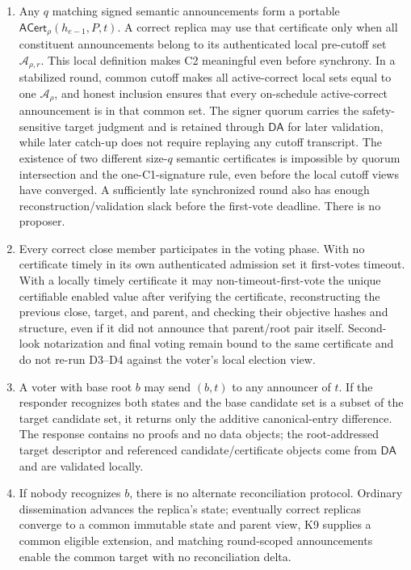 \documentclass[11pt]{article}
\theoremstyle{definition}
\theoremstyle{remark}
\newcommand{\DA}{\mathsf{DA}}
\newcommand{\ACert}{\mathsf{ACert}}
\begin{document}
\begin{enumerate}[leftmargin=2.0em]
  \item Any $q$ matching signed semantic announcements form a portable $\ACert_\rho(h_{e-1},P,t)$. A correct replica may use that certificate only when all constituent announcements belong to its authenticated local pre-cutoff set $\mathcal A_{\rho,r}$. This local definition makes C2 meaningful even before synchrony. In a stabilized round, common cutoff makes all active-correct local sets equal to one $\mathcal A_\rho$, and honest inclusion ensures that every on-schedule active-correct announcement is in that common set. The signer quorum carries the safety-sensitive target judgment and is retained through $\DA$ for later validation, while later catch-up does not require replaying any cutoff transcript. The existence of two different size-$q$ semantic certificates is impossible by quorum intersection and the one-C1-signature rule, even before the local cutoff views have converged. A sufficiently late synchronized round also has enough reconstruction/validation slack before the first-vote deadline. There is no proposer.

  \item Every correct close member participates in the voting phase. With no certificate timely in its own authenticated admission set it first-votes timeout. With a locally timely certificate it may non-timeout-first-vote the unique certifiable enabled value after verifying the certificate, reconstructing the previous close, target, and parent, and checking their objective hashes and structure, even if it did not announce that parent/root pair itself. Second-look notarization and final voting remain bound to the same certificate and do not re-run D3--D4 against the voter's local election view.

  \item A voter with base root $b$ may send $(b,t)$ to any announcer of $t$. If the responder recognizes both states and the base candidate set is a subset of the target candidate set, it returns only the additive canonical-entry difference. The response contains no proofs and no data objects; the root-addressed target descriptor and referenced candidate/certificate objects come from $\DA$ and are validated locally.

  \item If nobody recognizes $b$, there is no alternate reconciliation protocol. Ordinary dissemination advances the replica's state; eventually correct replicas converge to a common immutable state and parent view, K9 supplies a common eligible extension, and matching round-scoped announcements enable the common target with no reconciliation delta.


\end{enumerate}
\end{document}

